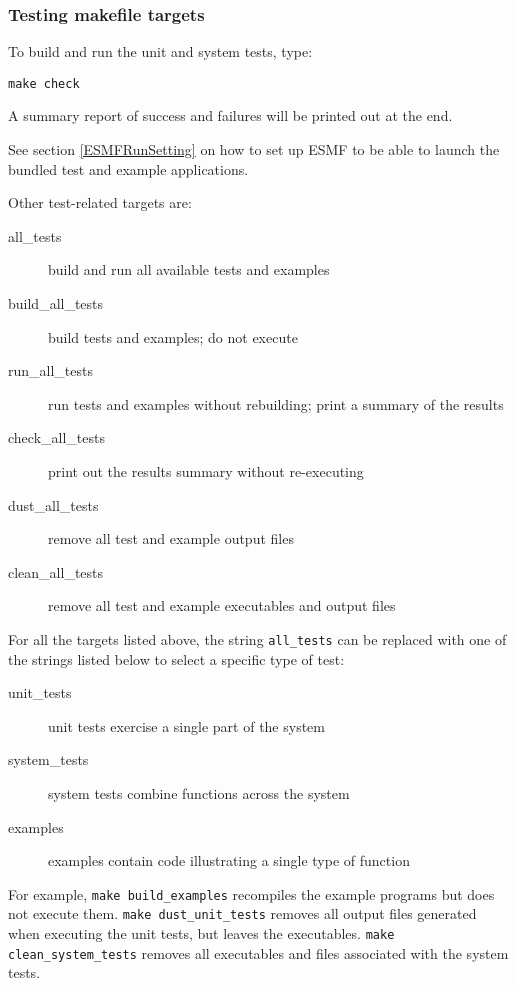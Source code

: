 \subsubsection{Testing makefile targets}

To build and run the unit and system tests, type:
\begin{verbatim}
make check
\end{verbatim}
A summary report of success and failures will be printed out at the end.

See section \ref{ESMFRunSetting} on how to set up ESMF to be able to launch
the bundled test and example applications.

\noindent Other test-related targets are:
\begin{description}
\item[all\_tests] build and run all available tests and examples
\item[build\_all\_tests] build tests and examples; do not execute
\item[run\_all\_tests] run tests and examples without rebuilding; print a
summary of the results
\item[check\_all\_tests] print out the results summary without re-executing
\item[dust\_all\_tests] remove all test and example output files
\item[clean\_all\_tests] remove all test and example executables and output
files
\end{description}

For all the targets listed above, the string {\tt all\_tests} can be
replaced with one of the strings listed below to select a
specific type of test:
\begin{description}
\item[unit\_tests] unit tests exercise a single part of the system
\item[system\_tests] system tests combine functions across the system
\item[examples] examples contain code illustrating a single type of function
\end{description}
For example, {\tt make build\_examples} recompiles the example programs but 
does not execute them. {\tt make dust\_unit\_tests} removes all
output files generated when executing the unit tests, but leaves the
executables. {\tt make clean\_system\_tests} removes all executables and files
associated with the system tests.


